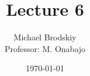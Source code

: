 


\title{Lecture 6}
\date{\today}
\author{Michael Brodskiy\\ \small Professor: M. Onabajo}



\maketitle

